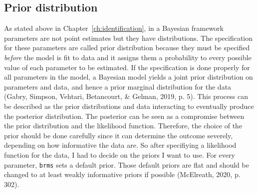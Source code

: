 \documentclass[a4, 12pt]{article}
\begin{document}
\hypertarget{prior-distribution}{%
\subsection{Prior distribution}\label{prior-distribution}}

\label{sec:priors}
As stated above in Chapter~\ref{ch:identification}, in a Bayesian framework parameters are not point estimates but they have distributions. The specification for these parameters are called prior distribution because they must be specified \emph{before} the model is fit to data and it assigns them a probability to every possible value of each parameter to be estimated. If the specification is done properly for all parameters in the model, a Bayesian model yields a joint prior distribution on parameters and data, and hence a prior marginal distribution for the data (Gabry, Simpson, Vehtari, Betancourt, \& Gelman, 2019, p. 5). This process can be described as the prior distributions and data interacting to eventually produce the posterior distribution. The posterior can be seen as a compromise between the prior distribution and the likelihood function. Therefore, the choice of the prior should be done carefully since it can determine the outcome severely, depending on how informative the data are. So after specifiying a likelihood function for the data, I had to decide on the priors I want to use. For every parameter, \texttt{brms} sets a default prior. Those default priors are flat and should be changed to at least weakly informative priors if possible (McElreath, 2020, p. 302).
\end{document}
